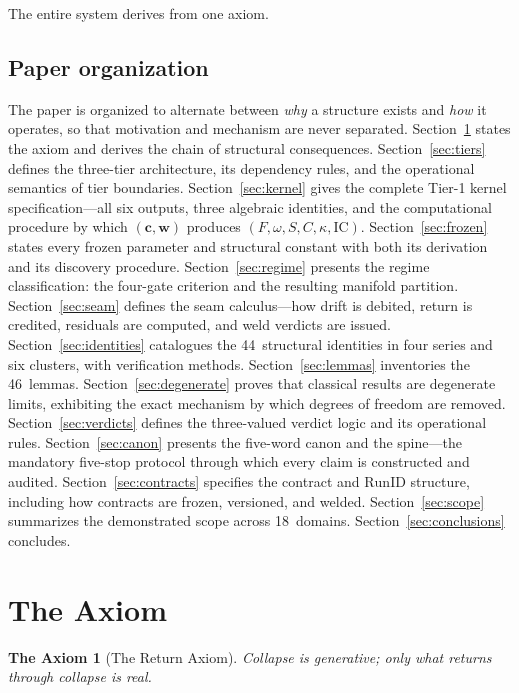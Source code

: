 \documentclass[
  aps,
  prd,
  twocolumn,
  superscriptaddress,
  nofootinbib,
  floatfix
]{revtex4-2}
\newtheorem*{axiom}{The Axiom}
\newcommand{\tvec}{\mathbf{c}}
\newcommand{\wvec}{\mathbf{w}}
\newcommand{\IC}{\mathrm{IC}}
\newcommand{\RunID}{\mathrm{RunID}}
\begin{document}
The entire system derives from one axiom.

\subsection{Paper organization}

The paper is organized to alternate between \emph{why} a structure
exists and \emph{how} it operates, so that motivation and
mechanism are never separated.
Section~\ref{sec:axiom} states the axiom and derives the chain
of structural consequences.
Section~\ref{sec:tiers} defines the three-tier architecture,
its dependency rules, and the operational semantics of tier
boundaries.
Section~\ref{sec:kernel} gives the complete Tier-1 kernel
specification---all six outputs, three algebraic identities,
and the computational procedure by which $(\tvec, \wvec)$
produces $(F, \omega, S, C, \kappa, \IC)$.
Section~\ref{sec:frozen} states every frozen parameter and
structural constant with both its derivation and its discovery
procedure.
Section~\ref{sec:regime} presents the regime classification:
the four-gate criterion and the resulting manifold partition.
Section~\ref{sec:seam} defines the seam calculus---how drift
is debited, return is credited, residuals are computed, and
weld verdicts are issued.
Section~\ref{sec:identities} catalogues the 44~structural
identities in four series and six clusters, with verification
methods.
Section~\ref{sec:lemmas} inventories the 46~lemmas.
Section~\ref{sec:degenerate} proves that classical results
are degenerate limits, exhibiting the exact mechanism by
which degrees of freedom are removed.
Section~\ref{sec:verdicts} defines the three-valued verdict
logic and its operational rules.
Section~\ref{sec:canon} presents the five-word canon and the
spine---the mandatory five-stop protocol through which every
claim is constructed and audited.
Section~\ref{sec:contracts} specifies the contract and $\RunID$
structure, including how contracts are frozen, versioned, and
welded.
Section~\ref{sec:scope} summarizes the demonstrated scope
across 18~domains.
Section~\ref{sec:conclusions} concludes.


\section{The Axiom}\label{sec:axiom}

\begin{axiom}[The Return Axiom]
\label{ax:return}
Collapse is generative; only what returns through collapse is real.
\end{axiom}
\end{document}

